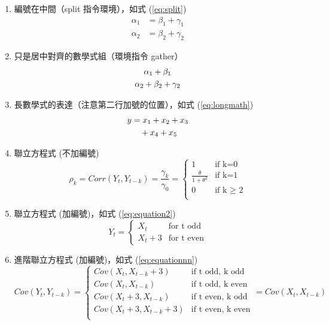 \begin{enumerate}
    \item 編號在中間（{\A split} 指令環境），如式 (\ref{eq:split})
        \begin{equation} 
            \begin{split} \label{eq:split}
                \alpha_1 &= \beta_1+\gamma_1\\
                \alpha_2 &= \beta_2+\gamma_2
            \end{split}
        \end{equation}
    \item 只是居中對齊的數學式組（環境指令 {\A gather}）
        \begin{gather}
        \alpha_1 + \beta_1\notag\\
        \alpha_2 + \beta_2 + \gamma_2\notag
        \end{gather}

    \item 長數學式的表達（注意第二行加號的位置），如式 (\ref{eq:longmath})
        \begin{align}\label{eq:longmath}
            y  	&= x_1 + x_2 + x_3 \notag\\
                	&\quad + x_4 + x_5
        \end{align}
        
    \item 聯立方程式 (不加編號)
     \[ \rho_k=Corr(Y_t,Y_{t-k})=\frac{\gamma_k}{\gamma_0}=\begin{cases}
 		1      &\text{if k=0}\\  
 		\frac{\theta}{1+\theta^{2}}      &\text{if k=1}\\  
 		0      &\text{if k $\geq$ 2}\\  
 	\end{cases}
    \]
    
    \item 聯立方程式 (加編號)，如式 (\ref{eq:equation2})
    \begin{equation}\label{eq:equation2}
      Y_t=\begin{cases}
 	   X_t      &\text{for t odd }\\  
 	   X_t+3       &\text{for t even}
    \end{cases}
    \end{equation}
    
    \item 進階聯立方程式 (加編號)，如式 (\ref{eq:equationnn})
    \begin{equation}\label{eq:equationnn}
    Cov(Y_t,Y_{t-k})=\begin{cases}
 		Cov(X_t,X_{t-k}+3)      &\text{if t odd, k odd}\\  
 		Cov(X_t,X_{t-k})       &\text{if t odd, k even}\\  
 		Cov(X_t+3,X_{t-k})      &\text{if t even, k odd}\\
 		Cov(X_t+3,X_{t-k}+3)      &\text{if t even, k even}\\         
 	\end{cases}=Cov(X_t,X_{t-k})
 	\end{equation}
    

\end{enumerate}
